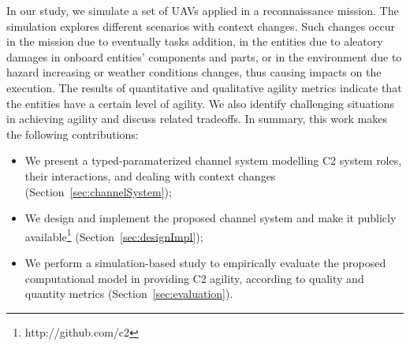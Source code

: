 In our study, we simulate a set of UAVs applied in a reconnaissance mission. The simulation explores different scenarios with context changes. Such changes occur in the mission due to eventually tasks addition, in the entities due to aleatory damages in onboard  entities’ components and parts, or in the environment due to hazard increasing or weather conditions changes, thus causing impacts on the execution. The results of quantitative and qualitative agility metrics indicate that the entities have a certain level of agility. We also identify challenging situations in achieving agility and discuss related tradeoffs. In summary, this work makes the following contributions:

\begin{itemize}
    \item We present a typed-paramaterized channel system modelling C2 system roles, their interactions, and dealing with context changes (Section~\ref{sec:channelSystem});
    \item We design and implement the proposed  channel system and make it  publicly available\footnote{http://github.com/c2} (Section~\ref{sec:designImpl});
    \item We perform a simulation-based study to empirically evaluate the proposed computational model in providing C2 agility, according to quality and quantity metrics (Section~\ref{sec:evaluation}). 
\end{itemize}
